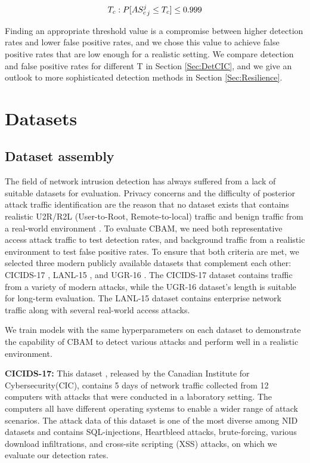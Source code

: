 \begin{align*}
T_{c}:P\Large[\large{AS_{c}^j\large}_j \leq T_c  \Large] \leq 0.999
\end{align*}

Finding an appropriate threshold value is a compromise between higher detection rates and lower false positive rates, and we chose this value to achieve false positive rates that are low enough for a realistic setting. We compare detection and false positive rates for different T in Section \ref{Sec:DetCIC}, and we give an outlook to more sophisticated detection methods in Section \ref{Sec:Resilience}.



\section{Datasets}\label{Sec:Datasets}

\subsection{Dataset assembly}\label{Sec:data}

The field of network intrusion detection has always suffered from a lack of suitable datasets for evaluation. Privacy concerns and the difficulty of posterior attack traffic identification are the reason that no dataset exists that contains realistic U2R/R2L (User-to-Root, Remote-to-local) traffic and benign traffic from a real-world environment \cite{ahmed2016survey}. 
To evaluate CBAM, we need both representative access attack traffic to test detection rates, and  background traffic from a realistic environment to test false positive rates. To ensure that both criteria are met, we selected three modern publicly available datasets that complement each other: CICIDS-17 \cite{sharafaldin2018toward}, LANL-15 \cite{akent-2015-enterprise-data,kent-2015-cyberdata1}, and UGR-16 \cite{macia2018ugr}. 
 The CICIDS-17 dataset contains traffic from a variety of modern attacks, while the UGR-16 dataset's length is suitable for long-term evaluation. The LANL-15 dataset contains enterprise network traffic along with several real-world access attacks.
 
 We train models with the same hyperparameters on each dataset to demonstrate the capability of CBAM to detect various attacks and perform well in a realistic environment. 



\textbf{CICIDS-17:}
This dataset \cite{sharafaldin2018toward}, released by the Canadian  Institute  for  Cybersecurity(CIC), contains 5 days of network traffic collected from 12 computers with attacks that were conducted in a laboratory setting. The computers all have different operating systems to enable a wider range of attack scenarios. The  attack  data  of  this  dataset  is  one  of  the  most  diverse  among  NID  datasets and contains SQL-injections, Heartbleed attacks, brute-forcing, various download infiltrations, and cross-site scripting (XSS) attacks, on which we evaluate our detection rates.

